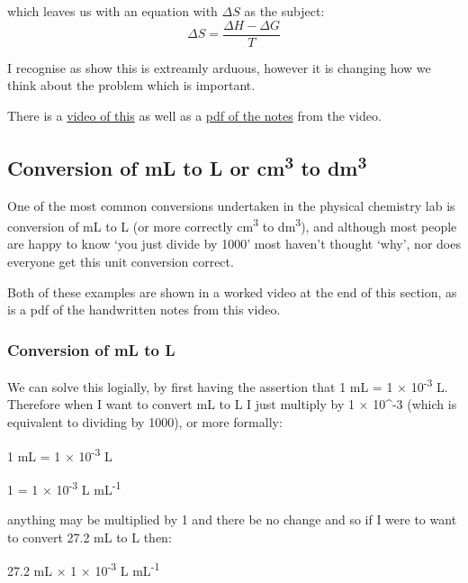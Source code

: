\documentclass[
]{book}
\begin{document}
which leaves us with an equation with \(\Delta S\) as the subject:
\begin{equation*}
\Delta S = \frac{\Delta H -\Delta G}{T}
\end{equation*}

I recognise as show this is extreamly arduous, however it is changing how we think about the problem which is important.

There is a \href{https://youtu.be/EKThFzuncTI}{video of this} as well as a \href{http://workitoutwithapencil.xyz/wp-content/uploads/2021/07/Rearranging-equations-.pdf}{pdf of the notes} from the video.

\hypertarget{conversion-of-ml-to-l-or-cm3-to-dm3}{%
\subsection{\texorpdfstring{Conversion of mL to L or cm\textsuperscript{3} to dm\textsuperscript{3}}{Conversion of mL to L or cm3 to dm3}}\label{conversion-of-ml-to-l-or-cm3-to-dm3}}

One of the most common conversions undertaken in the physical chemistry lab is conversion of mL to L (or more correctly cm\textsuperscript{3} to dm\textsuperscript{3}), and although most people are happy to know `you just divide by 1000' most haven't thought `why', nor does everyone get this unit conversion correct.

Both of these examples are shown in a worked video at the end of this section, as is a pdf of the handwritten notes from this video.

\hypertarget{conversion-of-ml-to-l}{%
\subsubsection{Conversion of mL to L}\label{conversion-of-ml-to-l}}

We can solve this logially, by first having the assertion that 1 mL = 1 × 10\textsuperscript{-3} L. Therefore when I want to convert mL to L I just multiply by 1 × 10\^{}-3 (which is equivalent to dividing by 1000), or more formally:

1 mL = 1 × 10\textsuperscript{-3} L

1 = 1 × 10\textsuperscript{-3} L mL\textsuperscript{-1}

anything may be multiplied by 1 and there be no change and so if I were to want to convert 27.2 mL to L then:

27.2 mL × 1 × 10\textsuperscript{-3} L mL\textsuperscript{-1}
\end{document}
